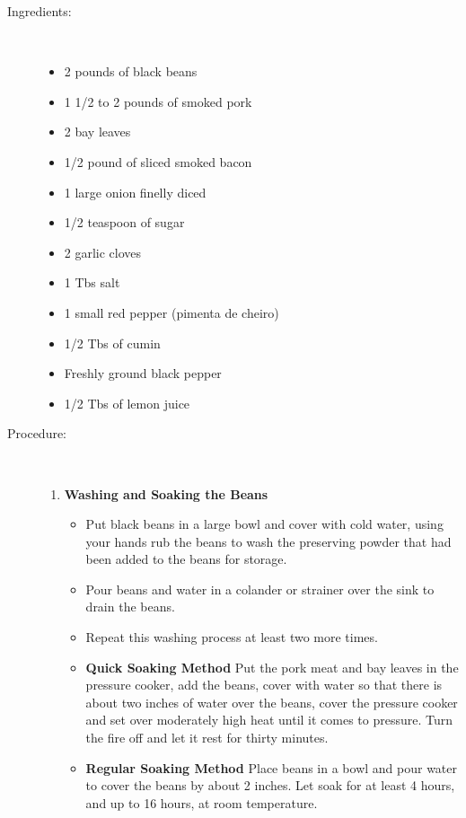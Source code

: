 \documentclass[11pt,letterpaper]{article}
\begin{document}
\begin{description}

\item[Ingredients:]\ \\
	\begin{itemize}
	\item	2 pounds of black beans
	\item 1 1/2 to 2 pounds of smoked pork
	\item 2 bay leaves 
	\item 1/2 pound of sliced smoked bacon 
	\item 1 large onion finelly diced
	\item 1/2 teaspoon of sugar
	\item 2 garlic cloves
	\item 1 Tbs salt
	\item 1 small red pepper (pimenta de cheiro)
	\item 1/2 Tbs of cumin
	\item Freshly ground black pepper
	\item 1/2 Tbs of lemon juice
	\end{itemize}

\item[Procedure:]\ \\

	\begin{enumerate}
	\item {\bf Washing and Soaking the Beans}
	\begin{itemize}
	\item Put black beans in a large bowl and cover with cold water, using your hands rub the beans to wash the preserving powder that had been added to the beans for storage.
	\item Pour beans and water in a colander or strainer over the sink to drain the beans.
	\item Repeat this washing process at least two more times.
	\item {\bf Quick Soaking Method} Put the pork meat and bay leaves in the pressure cooker, add the beans, cover with water so that there is about two inches of water over the beans, cover the pressure cooker and set over moderately high heat until it comes to pressure. Turn the fire off and let it rest for thirty minutes.
	\item {\bf Regular Soaking Method} Place beans in a bowl and pour water to cover the beans by about 2 inches. Let soak for at least 4 hours, and up to 16 hours, at room temperature.
	\end{itemize}
	

\end{enumerate}
\end{description}
\end{document}
